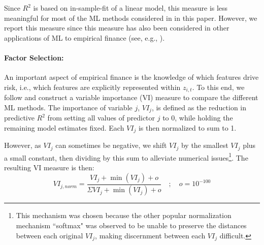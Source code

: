 \documentclass{article}
\begin{document}
Since $R^2$ is based on in-sample-fit of a linear model, this measure is less meaningful for most of the ML methods considered in in this paper. However, we report this measure since this measure has also been considered in other applications of ML to empirical finance (see, e.g., \cite{gu_empirical_2019}). 
\paragraph{Factor Selection:}
An important aspect of empirical finance is the knowledge of which features drive risk, i.e., which features are explicitly represented within $z_{i,t}$. To this end, we follow \cite{gu_empirical_2019}  and construct a variable importance (VI) measure to compare the different ML methods. The importance of variable $j$, $VI_j$, is defined as the reduction in predictive $R^2$ from setting all values of predictor $j$ to 0, while holding the remaining model estimates fixed. Each $VI_j$ is then normalized to sum to 1. 

However, as $VI_j$ can sometimes be negative, we shift $VI_j$ by the smallest $VI_j$ plus a small constant, then dividing by this sum to alleviate numerical issues\footnote{This mechanism was chosen because the other popular normalization mechanism ``softmax" was observed to be unable to preserve the distances between each original $VI_j$, making discernment between each $VI_j$ difficult.}. The resulting VI measure is then:
\begin{equation}
VI_{j, norm} = \frac{VI_j + \operatorname{min}(VI_j) + o}
{\Sigma VI_j + \operatorname{min}(VI_j) + o} \quad ; \quad o = 10^{-100}
\end{equation}

\end{document}
